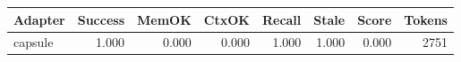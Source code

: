 \begin{tabular}{lrrrrrrr}
\hline
Adapter & Success & MemOK & CtxOK & Recall & Stale & Score & Tokens \\
\hline
capsule & 1.000 & 0.000 & 0.000 & 1.000 & 1.000 & 0.000 & 2751 \\
\hline
\end{tabular}
